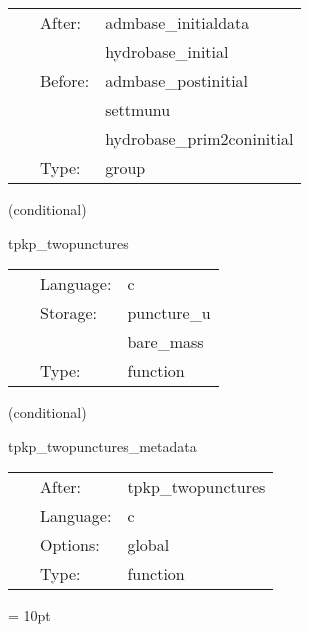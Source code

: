 \hspace{5mm}

 \begin{tabular*}{160mm}{cll} 
~ & After:  & admbase\_initialdata \\ 
~& ~ &hydrobase\_initial\\ 
~ & Before:  & admbase\_postinitial \\ 
~& ~ &settmunu\\ 
~& ~ &hydrobase\_prim2coninitial\\ 
~ & Type:  & group \\ 
\end{tabular*} 


\vspace{5mm}

   (conditional) 

\hspace{5mm} tpkp\_twopunctures 

\hspace{5mm}{\it create puncture black hole initial data } 


\hspace{5mm}

 \begin{tabular*}{160mm}{cll} 
~ & Language:  & c \\ 
~ & Storage:  & puncture\_u \\ 
~& ~ &bare\_mass\\ 
~ & Type:  & function \\ 
\end{tabular*} 


\vspace{5mm}

   (conditional) 

\hspace{5mm} tpkp\_twopunctures\_metadata 

\hspace{5mm}{\it output twopunctures metadata } 


\hspace{5mm}

 \begin{tabular*}{160mm}{cll} 
~ & After:  & tpkp\_twopunctures \\ 
~ & Language:  & c \\ 
~ & Options:  & global \\ 
~ & Type:  & function \\ 
\end{tabular*} 



\vspace{5mm}\parskip = 10pt 

